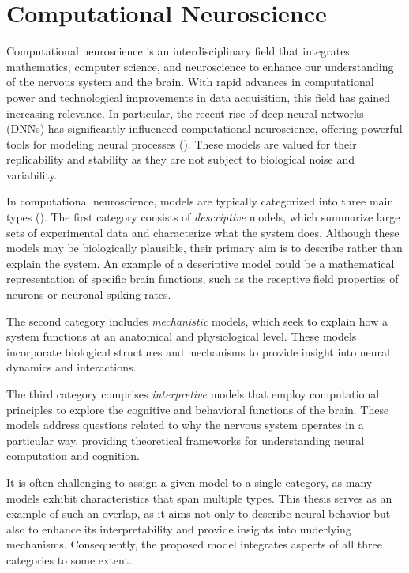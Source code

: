 \chapter{Computational Neuroscience}
\label{chap:computation_neuroscience}

Computational neuroscience is an interdisciplinary field that integrates mathematics, computer science, and neuroscience to enhance our understanding of the nervous system and the brain. With rapid advances in computational power and technological improvements in data acquisition, this field has gained increasing relevance. In particular, the recent rise of deep neural networks (DNNs) has significantly influenced computational neuroscience, offering powerful tools for modeling neural processes (\citet{Kietzmann133504}). These models are valued for their replicability and stability as they are not subject to biological noise and variability.

In computational neuroscience, models are typically categorized into three main types (\citet{dayan2005theoretical}). The first category consists of \emph{descriptive} models, which summarize large sets of experimental data and characterize what the system does. Although these models may be biologically plausible, their primary aim is to describe rather than explain the system. An example of a descriptive model could be a mathematical representation of specific brain functions, such as the receptive field properties of neurons or neuronal spiking rates.

The second category includes \emph{mechanistic} models, which seek to explain how a system functions at an anatomical and physiological level. These models incorporate biological structures and mechanisms to provide insight into neural dynamics and interactions.

The third category comprises \emph{interpretive} models that employ computational principles to explore the cognitive and behavioral functions of the brain. These models address questions related to why the nervous system operates in a particular way, providing theoretical frameworks for understanding neural computation and cognition.

It is often challenging to assign a given model to a single category, as many models exhibit characteristics that span multiple types. This thesis serves as an example of such an overlap, as it aims not only to describe neural behavior but also to enhance its interpretability and provide insights into underlying mechanisms. Consequently, the proposed model integrates aspects of all three categories to some extent.

